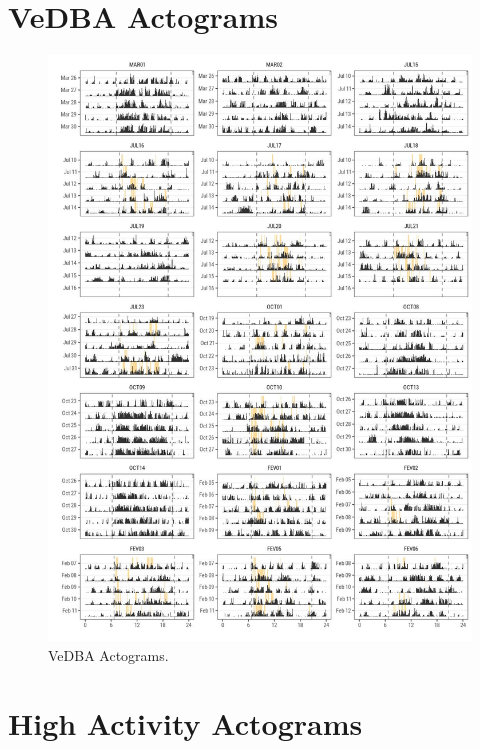 \documentclass[english,msc,numbers,hidelinks]{coppe}
\begin{document}
  \hypertarget{vedba-actograms}{%
  \section{VeDBA Actograms}\label{vedba-actograms}}
  \begin{figure}

  {\centering \includegraphics[width=1\linewidth]{../04_figures/actograms/actograms_vedba} 

  }

  \caption{VeDBA Actograms.}\label{fig:vedba-actograms}
  \end{figure}
  \hypertarget{high-activity-actograms}{%
  \section{High Activity Actograms}\label{high-activity-actograms}}
\end{document}
